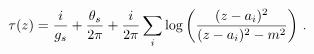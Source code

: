 \begin{equation}
\tau(z)= {i\over g_s} + \frac{\theta_{s}}{2\pi} + 
{i\over 2\pi }\sum_i \log \left (\frac{(z-a_i)^2}{(z-a_i)^2-m^2}\right )\,.\label{taud0}
\end{equation}

